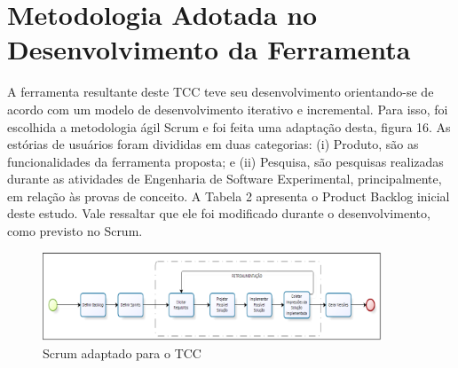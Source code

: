 \section{Metodologia Adotada no Desenvolvimento da Ferramenta}

A ferramenta resultante deste TCC teve seu desenvolvimento orientando-se de acordo com um modelo de desenvolvimento iterativo e incremental. Para isso, foi escolhida a metodologia ágil  Scrum e foi feita uma adaptação desta, figura 16. As estórias de usuários foram divididas em duas categorias: (i) Produto, são as funcionalidades da ferramenta proposta; e (ii) Pesquisa, são pesquisas realizadas durante as atividades de Engenharia de Software Experimental, principalmente, em relação às provas de conceito. A Tabela 2 apresenta o Product Backlog inicial deste estudo. Vale ressaltar que ele foi modificado durante o desenvolvimento, como previsto no Scrum.

\begin{figure}[h]
\centering
\label{f16}
\includegraphics[width=0.9\textwidth]{figuras/f28}
\caption{Scrum adaptado para o TCC}
\end{figure}

